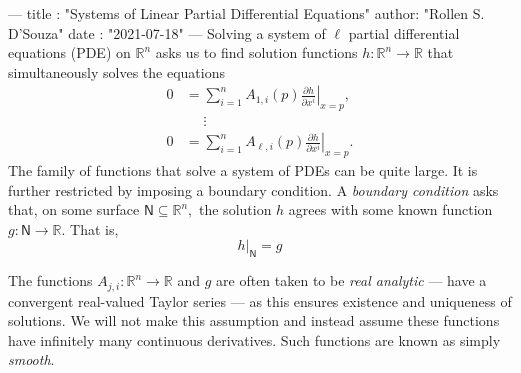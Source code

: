 ---
title :   "Systems of Linear Partial Differential Equations"
author:   "Rollen S. D'Souza"
date  :   "2021-07-18"
---
Solving a system of \(\ell\) partial differential equations (PDE) on \(\mathbb{R}^n\) asks us to find solution functions \(h: \mathbb{R}^n \to \mathbb{R}\) that simultaneously solves the equations
\[
\begin{aligned}
  0 &= \sum_{i = 1}^{n} A_{1, i}(p) \left.\frac{\partial h}{\partial x^i}\right|_{x = p},\\
    &\phantom{=} \vdots \\
  0 &= \sum_{i = 1}^{n} A_{\ell, i}(p) \left.\frac{\partial h}{\partial x^i}\right|_{x = p}.
\end{aligned}
\]
The family of functions that solve a system of PDEs can be quite large.
It is further restricted by imposing a boundary condition.
A \emph{boundary condition} asks that, on some surface \(\mathsf{N} \subseteq \mathbb{R}^n,\) the solution \(h\) agrees with some known function \(g: \mathsf{N} \to \mathbb{R}.\)
That is,
\[
  \left.h\right|_{\mathsf{N}} = g
\]

The functions \(A_{j, i}: \mathbb{R}^n \to \mathbb{R}\) and \(g\) are often taken to be \emph{real analytic} --- have a convergent real-valued Taylor series --- as this ensures existence and uniqueness of solutions.
We will not make this assumption and instead assume these functions have infinitely many continuous derivatives.
Such functions are known as simply \emph{smooth}.

